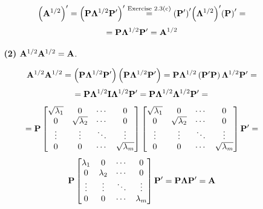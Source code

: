 \begin{enumerate}[font=\bfseries]
\begin{enumerate}
            \[
                {\left(\bold{A}^{1/2}\right)}^\prime
                =
                {\left(\bold{P}\bold{\Lambda}^{1/2}\bold{P}^\prime\right)}^\prime
                \overset{\text{Exercise 2.3(c)}}{=}
                {\left(\bold{P}^\prime\right)}^\prime {\left(\bold{\Lambda}^{1/2}\right)}^\prime {\left(\bold{P}\right)}^\prime
                =
            \]
            \[
                =
                \bold{P} \bold{\Lambda}^{1/2} \bold{P}^\prime
                =
                \bold{A}^{1/2}
            \]

            \item[\textbf{(2)}]{$\bold{A}^{1/2}\bold{A}^{1/2} = \bold{A}$.}
            
            \[
                \bold{A}^{1/2}\bold{A}^{1/2} = 
                \left(\bold{P}\bold{\Lambda}^{1/2}\bold{P}^\prime\right)\left(\bold{P}\bold{\Lambda}^{1/2}\bold{P}^\prime\right)
                =
                \bold{P}\bold{\Lambda}^{1/2}\left(\bold{P}^\prime\bold{P}\right)\bold{\Lambda}^{1/2}\bold{P}^\prime
                =
            \]
            \[
                =
                \bold{P}\bold{\Lambda}^{1/2}\bold{I}\bold{\Lambda}^{1/2}\bold{P}^\prime
                =
                \bold{P}\bold{\Lambda}^{1/2}\bold{\Lambda}^{1/2}\bold{P}^\prime
                =
            \]
            \[
                =
                \bold{P}
                \begin{bmatrix}
                    \sqrt{\lambda_1} & 0 & \cdots & 0 \\
                    0 & \sqrt{\lambda_2} & \cdots & 0 \\
                    \vdots & \vdots & \ddots & \vdots \\
                    0 & 0 & \cdots & \sqrt{\lambda_m}
                \end{bmatrix}
                \begin{bmatrix}
                    \sqrt{\lambda_1} & 0 & \cdots & 0 \\
                    0 & \sqrt{\lambda_2} & \cdots & 0 \\
                    \vdots & \vdots & \ddots & \vdots \\
                    0 & 0 & \cdots & \sqrt{\lambda_m}
                \end{bmatrix}
                \bold{P}^\prime
                =
            \]
            \[
                \bold{P}
                \begin{bmatrix}
                    \lambda_1 & 0 & \cdots & 0 \\
                    0 & \lambda_2 & \cdots & 0 \\
                    \vdots & \vdots & \ddots & \vdots \\
                    0 & 0 & \cdots & \lambda_m
                \end{bmatrix}
                \bold{P}^\prime
                =
                \bold{P}
                \bold{\Lambda}
                \bold{P}^\prime
                =
                \bold{A}
            \]


\end{enumerate}
\end{enumerate}
